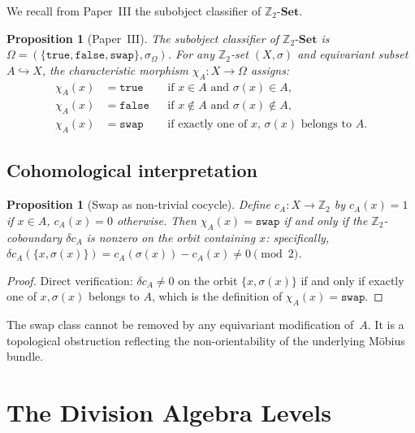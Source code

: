 \documentclass[12pt,a4paper]{article}
\newtheorem{proposition}[theorem]{Proposition}
\theoremstyle{definition}
\theoremstyle{remark}
\newcommand{\Z}{\mathbb{Z}}
\newcommand{\ZSet}{\Z_2\text{-}\mathbf{Set}}
\newcommand{\swap}{\mathtt{swap}}
\begin{document}
We recall from Paper~III the subobject classifier of $\ZSet$.

\begin{proposition}[Paper~III]
\label{prop:three-values}
The subobject classifier of $\ZSet$ is
$\Omega = (\{\mathtt{true}, \mathtt{false}, \swap\}, \sigma_\Omega)$.
For any $\Z_2$-set $(X, \sigma)$ and equivariant subset
$A \hookrightarrow X$, the characteristic morphism
$\chi_A \colon X \to \Omega$ assigns:
\begin{align*}
  \chi_A(x) &= \mathtt{true}  &&\text{if } x \in A \text{ and }
                                  \sigma(x) \in A, \\
  \chi_A(x) &= \mathtt{false} &&\text{if } x \notin A \text{ and }
                                  \sigma(x) \notin A, \\
  \chi_A(x) &= \swap           &&\text{if exactly one of } x,\,
                                  \sigma(x) \text{ belongs to } A.
\end{align*}
\end{proposition}

\subsection{Cohomological interpretation}

\begin{proposition}[Swap as non-trivial cocycle]
\label{prop:swap-cocycle}
Define $c_A \colon X \to \Z_2$ by $c_A(x) = 1$ if $x \in A$,
$c_A(x) = 0$ otherwise. Then $\chi_A(x) = \swap$ if and only if
the $\Z_2$-coboundary $\delta c_A$ is nonzero on the orbit
containing $x$: specifically,
$\delta c_A(\{x, \sigma(x)\}) = c_A(\sigma(x)) - c_A(x) \neq 0
\pmod{2}$.
\end{proposition}

\begin{proof}
Direct verification: $\delta c_A \neq 0$ on the orbit
$\{x, \sigma(x)\}$ if and only if exactly one of $x, \sigma(x)$
belongs to $A$, which is the definition of $\chi_A(x) = \swap$.
\end{proof}

The swap class cannot be removed by any equivariant modification
of~$A$. It is a topological obstruction reflecting the
non-orientability of the underlying M\"{o}bius bundle.


\section{The Division Algebra Levels}
\label{sec:NDA}
\end{document}
